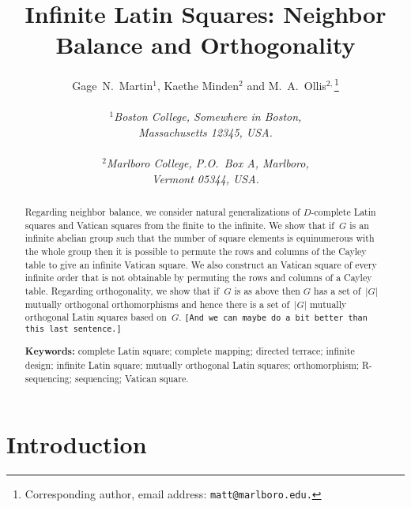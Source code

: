 \documentclass[12pt,a4paper]{article}
\begin{document}
\title{Infinite Latin Squares: Neighbor Balance and Orthogonality}

\author{Gage~N.~Martin$^{1}$, Kaethe Minden$^2$ and M.~A.~Ollis$^{2,}$\footnote{Corresponding author, email address: \texttt{matt@marlboro.edu.}}   \\
              \\
              {\it ${}^1$Boston College, Somewhere in Boston, } \\
              {\it Massachusetts 12345, USA.}
              \\
              \\
              {\it ${}^2$Marlboro College, P.O.~Box A, Marlboro,} \\    
              {\it Vermont 05344, USA.}  }
              

\maketitle



\begin{abstract}
Regarding neighbor balance, we consider natural generalizations of $D$-complete Latin squares and Vatican squares from the finite to the infinite.   We show that if~$G$ is an infinite abelian group such that the number of square elements is equinumerous with the whole group then it is possible to permute the rows and columns of the Cayley table to give an infinite Vatican square.  We also construct an Vatican square of every infinite order that is not obtainable by permuting the rows and columns of a Cayley table.  Regarding orthogonality, we show that if~$G$ is as above then $G$ has a set of~$|G|$ mutually orthogonal orthomorphisms and hence there is a set of~$|G|$ mutually orthogonal Latin squares based on~$G$.  \texttt{[And we can maybe do a bit better than this last sentence.]}



\vspace{3mm}
\noindent
{\bf Keywords:} complete Latin square; complete mapping; directed terrace; infinite design; infinite Latin square; mutually orthogonal Latin squares; orthomorphism; R-sequencing; sequencing; Vatican square.
\end{abstract}



\section{Introduction}\label{sec:intro}
\end{document}
